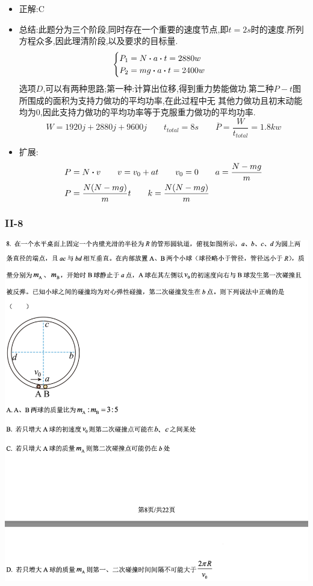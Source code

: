 \documentclass{article}
\begin{document}
    \begin{itemize}
        \item 正解:\quad C
        \item 总结:\quad 此题分为三个阶段,同时存在一个重要的速度节点,即$t = 2s$时的速度.所列方程众多,因此理清阶段,以及要求的目标量.
                  $$
                  \begin{cases}
                    P_{1} = N \vdot a \vdot t = 2880 w  \\
                    P_{2} = mg \vdot a \vdot t  = 2400 w
                  \end{cases}
                  $$
                  选项$D$,可以有两种思路;第一种:计算出位移,得到重力势能做功.第二种$P-t$图所围成的面积为支持力做功的平均功率,在此过程中无
                  其他力做功且初末动能均为0,因此支持力做功的平均功率等于克服重力做功的平均功率.
                  $$ W = 1920j + 2880j + 9600 j \qquad t_{total} = 8s \qquad \overline{P} = \frac{W}{t_{total}} = 1.8kw $$

        \item 扩展:
            \begin{align}
            P &= N \vdot v \qquad v = v_{0} + a t \qquad v_{0} = 0 \qquad a = \frac{N-mg}{m} \\
            P &= \frac{N(N-mg)}{m} t \qquad  k = \frac{N(N-mg)}{m}
          \end{align}
    \end{itemize}
    
    \subsubsection{II-8}
    \includegraphics[width=50em,keepaspectratio]{./pictures/1.2-3.png}
\end{document}
